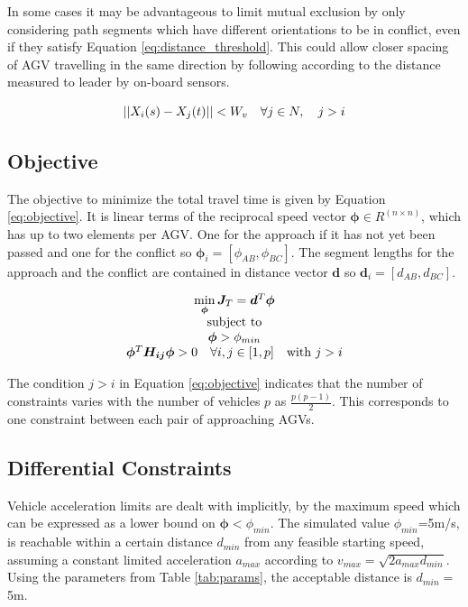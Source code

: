 In some cases it may be advantageous to limit mutual exclusion by only considering path segments which have different orientations to be in conflict, even if they satisfy Equation \ref{eq:distance_threshold}. This could allow closer spacing of AGV travelling in the same direction by following according to the distance measured to leader by on-board sensors.

\begin{equation}
\label{eq:distance_threshold}
||X_i(s) - X_j(t)|| < W_v \quad \forall j \in N, \quad j>i\\
\end{equation}

\subsection{Objective}
The objective to minimize the total travel time is given by Equation \ref{eq:objective}. It is linear terms of the reciprocal speed vector $\bm{\phi} \in R^{(n \times n)}$, which has up to two elements per AGV. One for the approach if it has not yet been passed and one for the conflict so $\bm{\phi}_i = [\phi_{AB}, \phi_{BC}]$. The segment lengths for the approach and the conflict are contained in distance vector $\bm{d}$ so $\bm{d}_i =[d_{AB}, d_{BC}] $.

\begin{equation}
\label{eq:objective}
\begin{array}{c}
\min \limits_{\bm{\phi}} \bm{J}_T = \bm{d}^T\bm{\phi} \\ 
$subject to$\\
\bm{\phi} > \phi_{min} \\
\bm{\phi}^T \bm{H_{ij}} \bm{\phi} > 0 \quad \forall i, j \in [1,p] \quad $with $ j > i \\
\end{array}
\end{equation}

The condition $j > i$ in Equation \ref{eq:objective} indicates that the number of constraints varies with the number of vehicles $p$ as $\frac{p(p-1)}{2}$. This corresponds to one constraint between each pair of approaching AGVs.

\subsection{Differential Constraints}
Vehicle acceleration limits are dealt with implicitly, by the maximum speed which can be expressed as a lower bound on $\bm{\phi} < \phi_{min}$. The simulated value $\phi_{min}$=5m/s, is reachable within a certain distance $d_{min}$ from any feasible starting speed, assuming a constant limited acceleration $a_{max}$ according to $v_{max} = \sqrt{2 a_{max} d_{min}} $. Using the parameters from Table \ref{tab:params}, the acceptable distance is $d_{min}=$5m.

